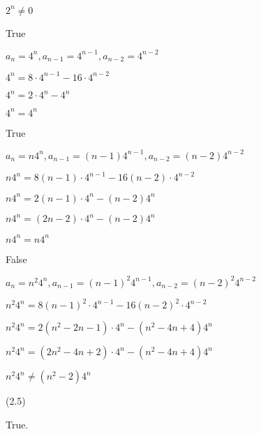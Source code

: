 \documentclass{exam}
\begin{document}
\begin{questions}
\begin{subparts}
\begin{center}
\( 2^n \neq 0 \)

\end{center}


\begin{center}
True

\( a_n = 4^n, a_{n-1} = 4^{n-1}, a_{n-2} = 4^{n-2} \)

\( 4^n = 8 \cdot 4^{n-1} - 16 \cdot 4^{n-2} \)

\( 4^n = 2 \cdot 4^{n} -  4^{n} \)

\( 4^n = 4^n \)

\end{center}


\begin{center}
True

\( a_n = n4^n, a_{n-1} = (n-1)4^{n-1}, a_{n-2} = (n-2)4^{n-2} \)

\( n4^n = 8(n-1) \cdot 4^{n-1} - 16(n-2) \cdot 4^{n-2} \)

\( n4^n = 2(n-1) \cdot 4^{n} - (n-2)4^{n} \)

\( n4^n = (2n-2) \cdot 4^{n} - (n-2)4^n \)

\( n4^n = n4^{n} \)

\end{center}


\begin{center}
False

\( a_n = n^2 4^n, a_{n-1} = (n-1)^2 4^{n-1}, a_{n-2} = (n-2)^2 4^{n-2} \)

\( n^2 4^n = 8(n-1)^2 \cdot 4^{n-1} - 16(n-2)^2 \cdot 4^{n-2} \)

\( n^2 4^n = 2(n^2-2n-1) \cdot 4^{n} - (n^2-4n+4)4^{n} \)

\( n^2 4^n = (2n^2-4n+2) \cdot 4^{n} - (n^2-4n+4)4^n \)

\( n^2 4^n \neq (n^2-2)4^{n} \)

\end{center}

\end{subparts}

 (2.5)
\begin{subparts}

\begin{center}

True.


\end{center}
\end{subparts}
\end{questions}
\end{document}
